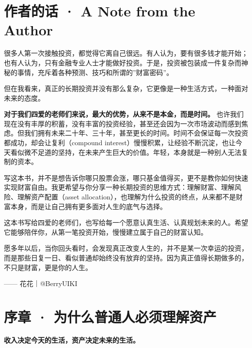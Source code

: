 \documentclass[a4paper,11pt,oneside,fontset=none,UTF8,zihao=-4]{ctexbook}
\begin{document}
\newpage

\chapter{作者的话 · A Note from the
Author}\label{ux4f5cux8005ux7684ux8bdd-a-note-from-the-author}

\begin{dhquote}
很多人第一次接触投资，都觉得它离自己很远。有人认为，要有很多钱才能开始；也有人认为，只有金融专业人士才能做好投资。于是，投资被包装成一件复杂而神秘的事情，充斥着各种预测、技巧和所谓的''财富密码''。
\end{dhquote}

但在我看来，真正的长期投资并没有那么复杂，它更像是一种生活方式，一种面对未来的态度。

\textbf{对于我们四爱的老师们来说，最大的优势，从来不是本金，而是时间。}
也许我们现在没有丰厚的积蓄，没有丰富的投资经验，甚至还会因为一次市场波动而感到焦虑。但我们拥有未来二十年、三十年，甚至更长的时间。时间不会保证每一次投资都成功，却会让复利（compound
interest）慢慢积累，让经验不断沉淀，也让今天看似微不足道的坚持，在未来产生巨大的价值。年轻，本身就是一种别人无法复制的资本。

写这本书，并不是想告诉你哪只股票会涨，哪只基金值得买，更不是教你如何快速实现财富自由。我更希望与你分享一种长期投资的思维方式：理解财富、理解风险、理解资产配置（asset
allocation），也理解为什么投资的终点，从来都不是财富本身，而是让自己拥有更多面对人生的底气与选择。

这本书写给四爱的老师们，也写给每一个愿意认真生活、认真规划未来的人。希望它能够陪伴你，从第一笔投资开始，慢慢建立属于自己的财富认知。

愿多年以后，当你回头看时，会发现真正改变人生的，并不是某一次幸运的投资，而是那些日复一日、看似普通却始终没有放弃的坚持。因为真正值得长期做多的，不只是财富，更是你的人生。

\begin{dhquote}
------ 花花｜@BerryUIKI
\end{dhquote}

\newpage

\chapter{序章 ·
为什么普通人必须理解资产}\label{ux5e8fux7ae0-ux4e3aux4ec0ux4e48ux666eux901aux4ebaux5fc5ux987bux7406ux89e3ux8d44ux4ea7}

\begin{dhquote}
\textbf{收入决定今天的生活，资产决定未来的生活。}
\end{dhquote}
\end{document}
